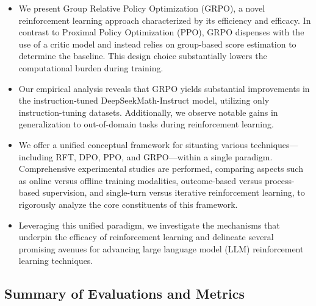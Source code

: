 \begin{itemize}[topsep=0pt]
    \item We present Group Relative Policy Optimization (GRPO), a novel reinforcement learning approach characterized by its efficiency and efficacy. In contrast to Proximal Policy Optimization (PPO), GRPO dispenses with the use of a critic model and instead relies on group-based score estimation to determine the baseline. This design choice substantially lowers the computational burden during training.
    \item Our empirical analysis reveals that GRPO yields substantial improvements in the instruction-tuned DeepSeekMath-Instruct model, utilizing only instruction-tuning datasets. Additionally, we observe notable gains in generalization to out-of-domain tasks during reinforcement learning.
    \item We offer a unified conceptual framework for situating various techniques—including RFT, DPO, PPO, and GRPO—within a single paradigm. Comprehensive experimental studies are performed, comparing aspects such as online versus offline training modalities, outcome-based versus process-based supervision, and single-turn versus iterative reinforcement learning, to rigorously analyze the core constituents of this framework.
    \item Leveraging this unified paradigm, we investigate the mechanisms that underpin the efficacy of reinforcement learning and delineate several promising avenues for advancing large language model (LLM) reinforcement learning techniques.
\end{itemize}

\subsection{Summary of Evaluations and Metrics}

